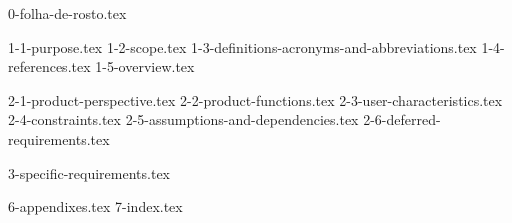 \documentclass[12pt,nodisplayskipstretch]{article}
\begin{document}
{0-folha-de-rosto.tex}
\newpage
\thispagestyle{empty}
\renewcommand{\contentsname}{\centering \normalsize \uppercase{SUMÁRIO}}
\tableofcontents
\clearpage


{1-1-purpose.tex}
{1-2-scope.tex}
{1-3-definitions-acronyms-and-abbreviations.tex}
{1-4-references.tex}
{1-5-overview.tex}

{2-1-product-perspective.tex}
{2-2-product-functions.tex}
{2-3-user-characteristics.tex}
{2-4-constraints.tex}
{2-5-assumptions-and-dependencies.tex}
{2-6-deferred-requirements.tex}

{3-specific-requirements.tex}


{6-appendixes.tex}
{7-index.tex}

\printglossaries
\end{document}

